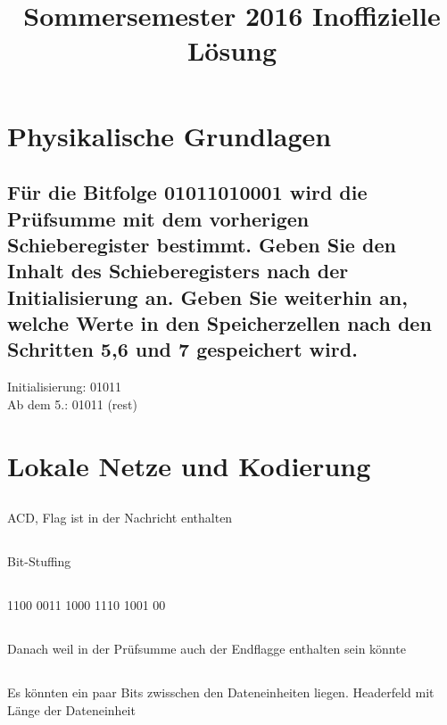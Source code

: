 \documentclass[a4paper]{article}
\title{Sommersemester 2016 Inoffizielle Lösung}
\begin{document}
\section{Physikalische Grundlagen}
\subsection{}
\subsection{}
\subsection{}
\subsection{}
\subsection{Für die Bitfolge 01011010001 wird die Prüfsumme mit dem vorherigen Schieberegister bestimmt. Geben Sie den Inhalt des Schieberegisters nach der Initialisierung an. Geben Sie weiterhin an, welche Werte in den Speicherzellen nach den Schritten 5,6 und 7 gespeichert wird.}
Initialisierung: 01011 \\
Ab dem 5.: 01011 (rest)
\section{Lokale Netze und Kodierung}
\subsection{}
ACD, Flag ist in der Nachricht enthalten
\subsection{}
Bit-Stuffing
\subsection{}
1100 0011 1000 1110 1001 00
\subsection{}
Danach weil in der Prüfsumme auch der Endflagge enthalten sein könnte
\subsection{}
Es könnten ein paar Bits zwisschen den Dateneinheiten liegen.
Headerfeld mit Länge der Dateneinheit
\end{document}
